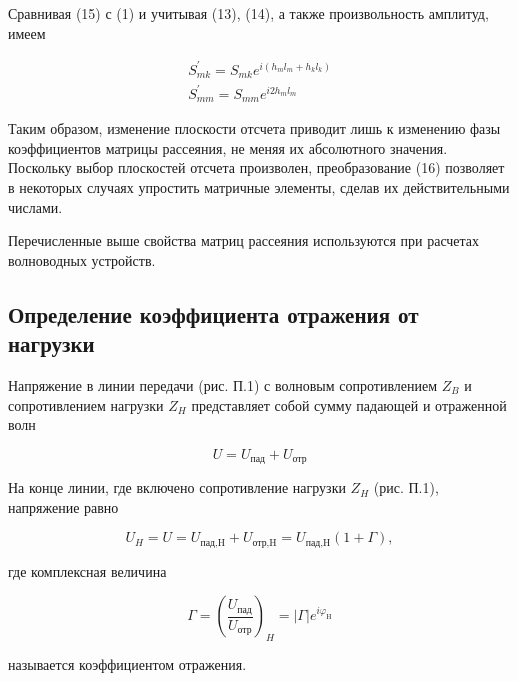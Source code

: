 Сравнивая (15) с (1) и учитывая (13), (14), а также произвольность амплитуд, имеем

\begin{equation}
	\begin{array} { l } { S _ { m k } ^ { \prime } = S _ { m k } e ^ { i \left( h _ { m } l _ { m } + h _ { k } l _ { k } \right) } } \\ { S _ { m m } ^ { \prime } = S _ { m m } e ^ { i 2 h _ { m } l _ { m } } } \end{array}
\end{equation}

Таким образом, изменение плоскости отсчета приводит лишь к изменению фазы коэффициентов матрицы рассеяния, не меняя их абсолютного значения. Поскольку выбор плоскостей отсчета произволен, преобразование (16) позволяет в некоторых случаях упростить матричные элементы, сделав их действительными числами.

Перечисленные выше свойства матриц рассеяния используются при расчетах волноводных устройств.

\subsection{Определение коэффициента отражения от нагрузки}


Напряжение в линии передачи (рис. П.1) с волновым сопротивлением $Z_B$ и сопротивлением нагрузки $Z_H$ представляет собой сумму падающей и отраженной волн

\begin{equation}
	U=U_\text{пад}+U_\text{отр}
\end{equation}

На конце линии, где включено сопротивление нагрузки $Z_H$ (рис. П.1), напряжение равно

\begin{equation}
	U_H=U=U_\text{пад,H}+U_\text{отр,H}=U_\text{пад,H}(1+\Gamma),
\end{equation}

где комплексная величина

\begin{equation}
	\Gamma=\left(\frac{U_\text{пад}}{U_\text{отр}}\right)_H= | \Gamma | e ^ { i \varphi _ { \mathrm { H } } }
\end{equation}

называется коэффициентом отражения.

